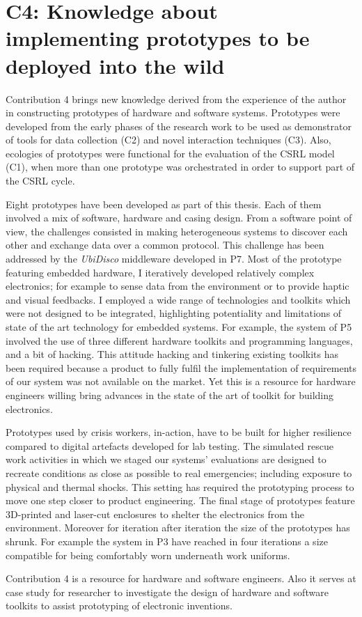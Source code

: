 \section{C4: Knowledge about implementing prototypes to be deployed into the wild}\label{c4-knowledge-about-implementing-prototypes-to-be-deployed-into-the-wild}

Contribution 4 brings new knowledge derived from the experience of the author in constructing prototypes of hardware and software systems. Prototypes were developed from the early phases of the research work to be used as demonstrator of tools for data collection (C2) and novel interaction techniques (C3). Also, ecologies of prototypes were functional for the evaluation of the CSRL model (C1), when more than one prototype was orchestrated in order to support part of the CSRL cycle.

Eight prototypes have been developed as part of this thesis. Each of them involved a mix of software, hardware and casing design. From a software point of view, the challenges consisted in making heterogeneous systems to discover each other and exchange data over a common protocol. This challenge has been addressed by the \emph{UbiDisco} middleware developed in P7. Most of the prototype featuring embedded hardware, I iteratively developed relatively complex electronics; for example to sense data from the environment or to provide haptic and visual feedbacks. I employed a wide range of technologies and toolkits which were not designed to be integrated, highlighting potentiality and limitations of state of the art technology for embedded systems. For example, the system of P5 involved the use of three different hardware toolkits and programming languages, and a bit of hacking. This attitude hacking and tinkering existing toolkits has been required because a product to fully fulfil the implementation of requirements of our system was not available on the market. Yet this is a resource for hardware engineers willing bring advances in the state of the art of toolkit for building electronics.

Prototypes used by crisis workers, in-action, have to be built for higher resilience compared to digital artefacts developed for lab testing. The simulated rescue work activities in which we staged our systems' evaluations are designed to recreate conditions as close as possible to real emergencies; including exposure to physical and thermal shocks. This setting has required the prototyping process to move one step closer to product engineering. The final stage of prototypes feature 3D-printed and laser-cut enclosures to shelter the electronics from the environment. Moreover for iteration after iteration the size of the prototypes has shrunk. For example the system in P3 have reached in four iterations a size compatible for being comfortably worn underneath work uniforms.

Contribution 4 is a resource for hardware and software engineers. Also it serves at case study for researcher to investigate the design of hardware and software toolkits to assist prototyping of electronic inventions. 
